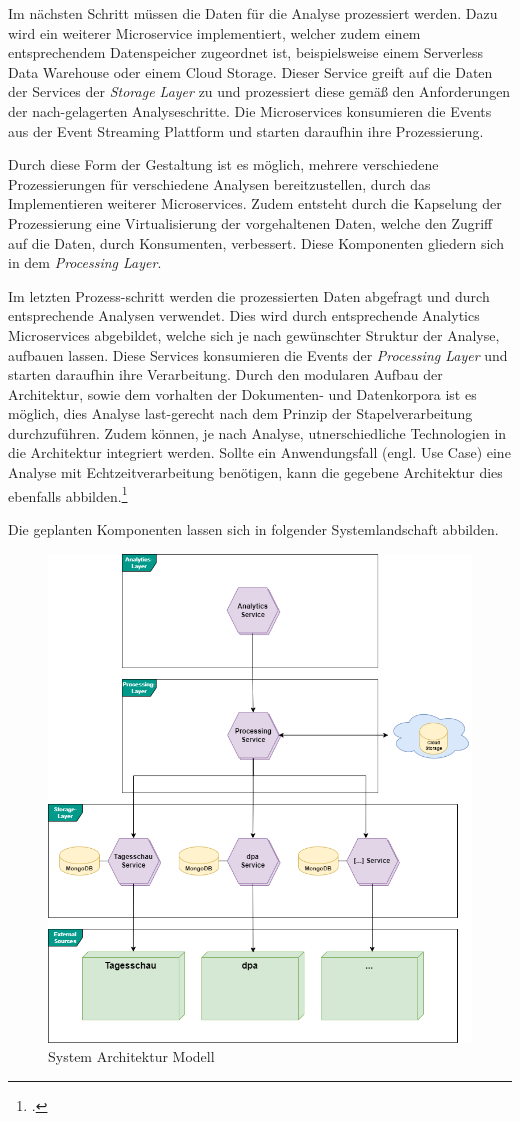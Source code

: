Im nächsten Schritt müssen die Daten für die Analyse prozessiert werden. Dazu wird ein weiterer Microservice implementiert, welcher zudem einem entsprechendem Datenspeicher zugeordnet ist, beispielsweise einem Serverless Data Warehouse oder einem Cloud Storage. 
Dieser Service greift auf die Daten der Services der \textit{Storage Layer} zu und prozessiert diese gemäß den Anforderungen der nach-gelagerten Analyseschritte. 
Die Microservices konsumieren die Events aus der Event Streaming Plattform und starten daraufhin ihre Prozessierung.

Durch diese Form der Gestaltung ist es möglich, mehrere verschiedene Prozessierungen für verschiedene Analysen bereitzustellen, durch das Implementieren weiterer Microservices. Zudem entsteht durch die Kapselung der Prozessierung eine Virtualisierung der vorgehaltenen Daten, welche den Zugriff auf die Daten, durch Konsumenten, verbessert. Diese Komponenten gliedern sich in dem \textit{Processing Layer}.

Im letzten Prozess-schritt werden die prozessierten Daten abgefragt und durch entsprechende Analysen verwendet. Dies wird durch entsprechende Analytics Microservices abgebildet, welche sich je nach gewünschter Struktur der Analyse, aufbauen lassen. Diese Services konsumieren die Events der \textit{Processing Layer} und starten daraufhin ihre Verarbeitung. Durch den modularen Aufbau der Architektur, sowie dem vorhalten der Dokumenten- und Datenkorpora ist es möglich, dies Analyse last-gerecht nach dem Prinzip der Stapelverarbeitung durchzuführen.
Zudem können, je nach Analyse, utnerschiedliche Technologien in die Architektur integriert werden.
Sollte ein Anwendungsfall (engl. Use Case) eine Analyse mit Echtzeitverarbeitung benötigen, kann die gegebene Architektur dies ebenfalls abbilden.\footcite[Vgl.][]{Hsu.MicroserviceAnalyticsPlattform.2018}{}{}

Die geplanten Komponenten lassen sich in folgender Systemlandschaft abbilden.

\begin{figure}[H]
    \centering
    \includegraphics[width=0.5\linewidth]{abbildungen/System Architektur.drawio.png}
    \caption{System Architektur Modell}
    \label{fig:system-architecture}
\end{figure}
\newpage
